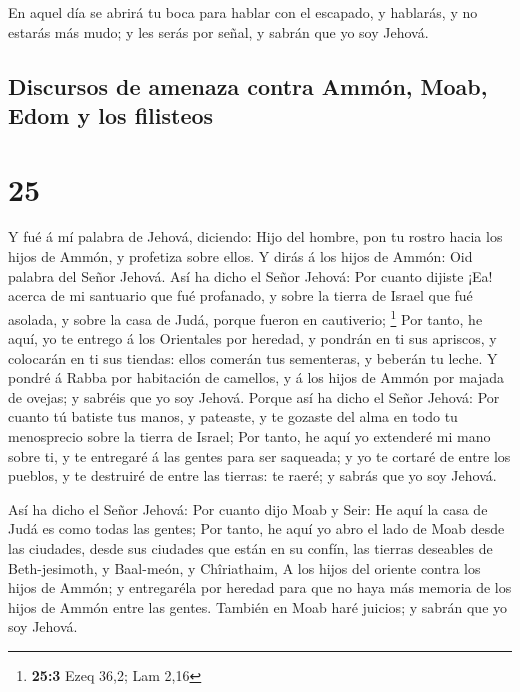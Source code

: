  En aquel día se abrirá tu boca para hablar con el
escapado, y hablarás, y no estarás más mudo; y les serás por señal, y
sabrán que yo soy Jehová.

\hypertarget{discursos-de-amenaza-contra-ammuxf3n-moab-edom-y-los-filisteos}{%
\subsection{Discursos de amenaza contra Ammón, Moab, Edom y los
filisteos}\label{discursos-de-amenaza-contra-ammuxf3n-moab-edom-y-los-filisteos}}

\hypertarget{section-24}{%
\section{25}\label{section-24}}

 Y fué á mí palabra de Jehová, diciendo:  Hijo
del hombre, pon tu rostro hacia los hijos de Ammón, y profetiza sobre
ellos.  Y dirás á los hijos de Ammón: Oid palabra del Señor
Jehová. Así ha dicho el Señor Jehová: Por cuanto dijiste ¡Ea! acerca de
mi santuario que fué profanado, y sobre la tierra de Israel que fué
asolada, y sobre la casa de Judá, porque fueron en cautiverio;
\footnote{\textbf{25:3} Ezeq 36,2; Lam 2,16}  Por tanto, he
aquí, yo te entrego á los Orientales por heredad, y pondrán en ti sus
apriscos, y colocarán en ti sus tiendas: ellos comerán tus sementeras, y
beberán tu leche.  Y pondré á Rabba por habitación de
camellos, y á los hijos de Ammón por majada de ovejas; y sabréis que yo
soy Jehová.  Porque así ha dicho el Señor Jehová: Por cuanto
tú batiste tus manos, y pateaste, y te gozaste del alma en todo tu
menosprecio sobre la tierra de Israel;  Por tanto, he aquí
yo extenderé mi mano sobre ti, y te entregaré á las gentes para ser
saqueada; y yo te cortaré de entre los pueblos, y te destruiré de entre
las tierras: te raeré; y sabrás que yo soy Jehová.

 Así ha dicho el Señor Jehová: Por cuanto dijo Moab y Seir:
He aquí la casa de Judá es como todas las gentes;  Por
tanto, he aquí yo abro el lado de Moab desde las ciudades, desde sus
ciudades que están en su confín, las tierras deseables de Beth-jesimoth,
y Baal-meón, y Chîriathaim,  A los hijos del oriente contra
los hijos de Ammón; y entregaréla por heredad para que no haya más
memoria de los hijos de Ammón entre las gentes.  También en
Moab haré juicios; y sabrán que yo soy Jehová.

